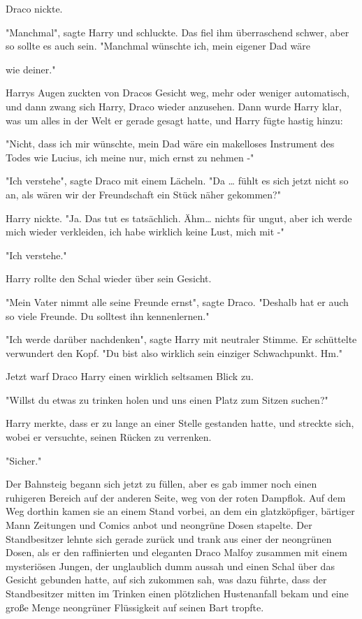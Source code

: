 {Draco nickte.

"Manchmal", sagte Harry und schluckte. Das fiel ihm überraschend schwer, aber so sollte es auch sein. "Manchmal wünschte ich, mein eigener Dad wäre

wie deiner."

Harrys Augen zuckten von Dracos Gesicht weg, mehr oder weniger automatisch, und dann zwang sich Harry, Draco wieder anzusehen. Dann wurde Harry klar, was um alles in der Welt er gerade gesagt hatte, und Harry fügte hastig hinzu:

"Nicht, dass ich mir wünschte, mein Dad wäre ein makelloses Instrument des Todes wie Lucius, ich meine nur, mich ernst zu nehmen -"

"Ich verstehe", sagte Draco mit einem Lächeln. "Da … fühlt es sich jetzt nicht so an, als wären wir der Freundschaft ein Stück näher gekommen?"

Harry nickte. "Ja. Das tut es tatsächlich. Ähm… nichts für ungut, aber ich werde mich wieder verkleiden, ich habe wirklich keine Lust, mich mit -"

"Ich verstehe."

Harry rollte den Schal wieder über sein Gesicht.

"Mein Vater nimmt alle seine Freunde ernst", sagte Draco. "Deshalb hat er auch so viele Freunde. Du solltest ihn kennenlernen."

"Ich werde darüber nachdenken", sagte Harry mit neutraler Stimme. Er schüttelte verwundert den Kopf. "Du bist also wirklich sein einziger Schwachpunkt. Hm."

Jetzt warf Draco Harry einen wirklich seltsamen Blick zu.

"Willst du etwas zu trinken holen und uns einen Platz zum Sitzen suchen?"

Harry merkte, dass er zu lange an einer Stelle gestanden hatte, und streckte sich, wobei er versuchte, seinen Rücken zu verrenken.

"Sicher."

Der Bahnsteig begann sich jetzt zu füllen, aber es gab immer noch einen ruhigeren Bereich auf der anderen Seite, weg von der roten Dampflok. Auf dem Weg dorthin kamen sie an einem Stand vorbei, an dem ein glatzköpfiger, bärtiger Mann Zeitungen und Comics anbot und neongrüne Dosen stapelte. Der Standbesitzer lehnte sich gerade zurück und trank aus einer der neongrünen Dosen, als er den raffinierten und eleganten Draco Malfoy zusammen mit einem mysteriösen Jungen, der unglaublich dumm aussah und einen Schal über das Gesicht gebunden hatte, auf sich zukommen sah, was dazu führte, dass der Standbesitzer mitten im Trinken einen plötzlichen Hustenanfall bekam und eine große Menge neongrüner Flüssigkeit auf seinen Bart tropfte.

}
